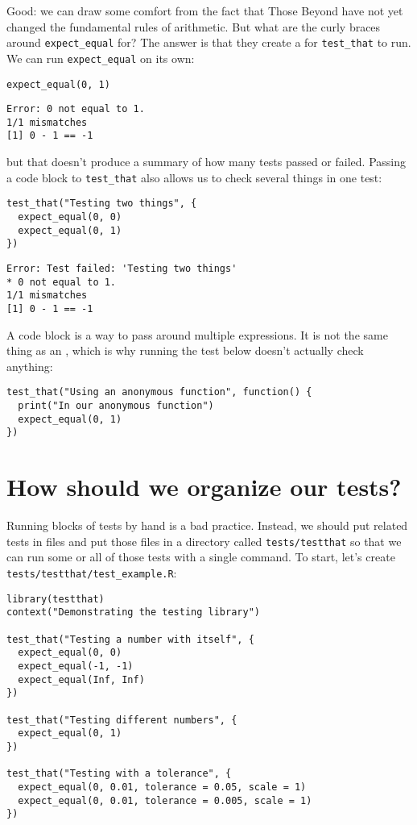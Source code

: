 Good:
we can draw some comfort from the fact that Those Beyond have not yet changed the fundamental rules of arithmetic.
But what are the curly braces around \texttt{expect\_equal} for?
The answer is that they create a  for \texttt{test\_that} to run.
We can run \texttt{expect\_equal} on its own:

\begin{lstlisting}
expect_equal(0, 1)
\end{lstlisting}

\begin{lstlisting}
Error: 0 not equal to 1.
1/1 mismatches
[1] 0 - 1 == -1
\end{lstlisting}

\noindent
but that doesn't produce a summary of how many tests passed or failed.
Passing a code block to \texttt{test\_that} also allows us to check several things in one test:

\begin{lstlisting}
test_that("Testing two things", {
  expect_equal(0, 0)
  expect_equal(0, 1)
})
\end{lstlisting}

\begin{lstlisting}
Error: Test failed: 'Testing two things'
* 0 not equal to 1.
1/1 mismatches
[1] 0 - 1 == -1
\end{lstlisting}

A code block is a way to pass around multiple expressions.
It is not the same thing as an ,
which is why running the test below doesn't actually check anything:

\begin{lstlisting}
test_that("Using an anonymous function", function() {
  print("In our anonymous function")
  expect_equal(0, 1)
})
\end{lstlisting}

\section{How should we organize our tests?}\label{testerror-organize}

Running blocks of tests by hand is a bad practice.
Instead,
we should put related tests in files
and put those files in a directory called \texttt{tests/testthat}
so that we can run some or all of those tests with a single command.
To start,
let's create \texttt{tests/testthat/test\_example.R}:

\begin{lstlisting}
library(testthat)
context("Demonstrating the testing library")

test_that("Testing a number with itself", {
  expect_equal(0, 0)
  expect_equal(-1, -1)
  expect_equal(Inf, Inf)
})

test_that("Testing different numbers", {
  expect_equal(0, 1)
})

test_that("Testing with a tolerance", {
  expect_equal(0, 0.01, tolerance = 0.05, scale = 1)
  expect_equal(0, 0.01, tolerance = 0.005, scale = 1)
})
\end{lstlisting}

